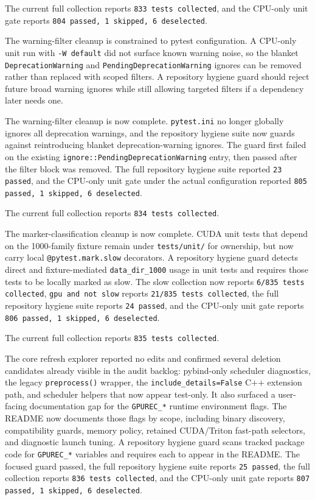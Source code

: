 \documentclass[11pt]{article}
\begin{document}
The current full collection reports \texttt{833 tests collected}, and the
CPU-only unit gate reports \texttt{804 passed, 1 skipped, 6 deselected}.

The warning-filter cleanup is constrained to pytest configuration.  A CPU-only
unit run with \texttt{-W default} did not surface known warning noise, so the
blanket \texttt{DeprecationWarning} and \texttt{PendingDeprecationWarning}
ignores can be removed rather than replaced with scoped filters.  A repository
hygiene guard should reject future broad warning ignores while still allowing
targeted filters if a dependency later needs one.

The warning-filter cleanup is now complete.  \texttt{pytest.ini} no longer
globally ignores all deprecation warnings, and the repository hygiene suite now
guards against reintroducing blanket deprecation-warning ignores.  The guard
first failed on the existing \texttt{ignore::PendingDeprecationWarning} entry,
then passed after the filter block was removed.  The full repository hygiene
suite reported \texttt{23 passed}, and the CPU-only unit gate under the actual
configuration reported \texttt{805 passed, 1 skipped, 6 deselected}.

The current full collection reports \texttt{834 tests collected}.

The marker-classification cleanup is now complete.  CUDA unit tests that depend
on the 1000-family fixture remain under \texttt{tests/unit/} for ownership, but
now carry local \texttt{@pytest.mark.slow} decorators.  A repository hygiene
guard detects direct and fixture-mediated \texttt{data\_dir\_1000} usage in unit
tests and requires those tests to be locally marked as slow.  The slow
collection now reports \texttt{6/835 tests collected}, \texttt{gpu and not slow}
reports \texttt{21/835 tests collected}, the full repository hygiene suite
reports \texttt{24 passed}, and the CPU-only unit gate reports
\texttt{806 passed, 1 skipped, 6 deselected}.

The current full collection reports \texttt{835 tests collected}.

The core refresh explorer reported no edits and confirmed several deletion
candidates already visible in the audit backlog: pybind-only scheduler
diagnostics, the legacy \texttt{preprocess()} wrapper, the
\texttt{include\_details=False} C++ extension path, and scheduler helpers that
now appear test-only.  It also surfaced a user-facing documentation gap for the
\texttt{GPUREC\_*} runtime environment flags.  The README now documents those
flags by scope, including binary discovery, compatibility guards, memory
policy, retained CUDA/Triton fast-path selectors, and diagnostic launch tuning.
A repository hygiene guard scans tracked package code for \texttt{GPUREC\_*}
variables and requires each to appear in the README.  The focused guard passed,
the full repository hygiene suite reports \texttt{25 passed}, the full
collection reports \texttt{836 tests collected}, and the CPU-only unit gate
reports \texttt{807 passed, 1 skipped, 6 deselected}.
\end{document}
